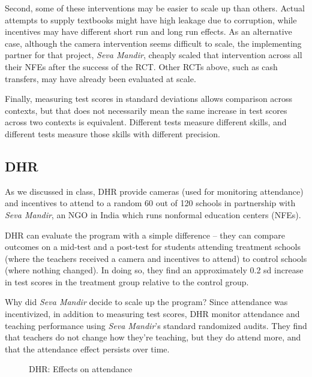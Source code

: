 \documentclass[12pt,english]{article}
\begin{document}
Second, some of these interventions may be easier to scale up than others. Actual attempts to supply textbooks might have high leakage due to corruption, while incentives may have different short run and long run effects. As an alternative case, although the camera intervention seems difficult to scale, the implementing partner for that project, \textit{Seva Mandir}, cheaply scaled that intervention across all their NFEs after the success of the RCT. Other RCTs above, such as cash transfers, may have already been evaluated at scale.

Finally, measuring test scores in standard deviations allows comparison across contexts, but that does not necessarily mean the same increase in test scores across two contexts is equivalent. Different tests measure different skills, and different tests measure those skills with different precision.

\subsection{DHR}

As we discussed in class, DHR provide cameras (used for monitoring attendance) and incentives to attend to a random 60 out of 120 schools in partnership with \textit{Seva Mandir}, an NGO in India which runs nonformal education centers (NFEs).

DHR can evaluate the program with a simple difference -- they can compare outcomes on a mid-test and a post-test for students attending treatment schools (where the teachers received a camera and incentives to attend) to control schools (where nothing changed). In doing so, they find an approximately 0.2 sd increase in test scores in the treatment group relative to the control group.

Why did \textit{Seva Mandir} decide to scale up the program? Since attendance was incentivized, in addition to measuring test scores, DHR monitor attendance and teaching performance using \textit{Seva Mandir}'s standard randomized audits. They find that teachers do not change how they're teaching, but they do attend more, and that the attendance effect persists over time.

\begin{figure}[H]
	\caption{DHR: Effects on attendance}
	\centering
\end{figure}
\end{document}
